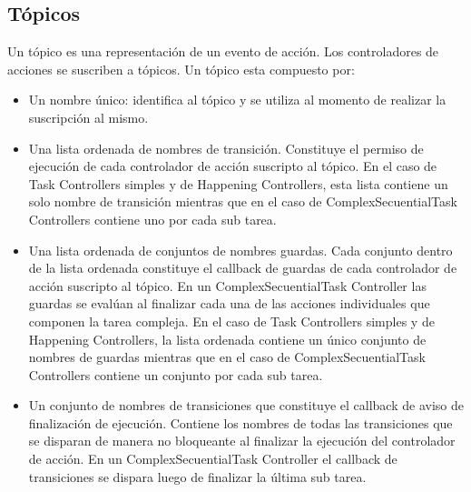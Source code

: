 \subsection{Tópicos}
\label{sec:diseno_topicos}
Un tópico es una representación de un evento de acción. Los controladores de
acciones se suscriben a tópicos.
Un tópico esta compuesto por:
\begin{itemize}
  \item Un nombre único: identifica al tópico y se utiliza al momento de
  realizar la suscripción al mismo.
  \item Una lista ordenada de nombres de transición. Constituye el permiso
  de ejecución de cada controlador de acción suscripto al tópico. En el caso de
  Task Controllers simples y de Happening Controllers, esta lista contiene
  un solo nombre de transición mientras que en el caso de ComplexSecuentialTask
  Controllers contiene uno por cada sub tarea.
  \item Una lista ordenada de conjuntos de nombres guardas. Cada conjunto
   dentro de la lista ordenada constituye el callback de guardas de cada
   controlador de acción suscripto al tópico. En un ComplexSecuentialTask
   Controller las guardas se evalúan al finalizar cada una de las acciones
   individuales que componen la tarea compleja. En el caso de
  Task Controllers simples y de Happening Controllers, la lista ordenada
  contiene un único conjunto de nombres de guardas mientras que en el caso de
  ComplexSecuentialTask Controllers contiene un conjunto por cada sub tarea.
  \item Un conjunto de nombres de transiciones que constituye el callback de
  aviso de finalización de ejecución. Contiene los nombres de todas las
  transiciones que se disparan de manera no bloqueante al finalizar la ejecución
  del controlador de acción. En un  ComplexSecuentialTask
  Controller el callback de transiciones se dispara luego de finalizar la última
  sub tarea.
\end{itemize}
